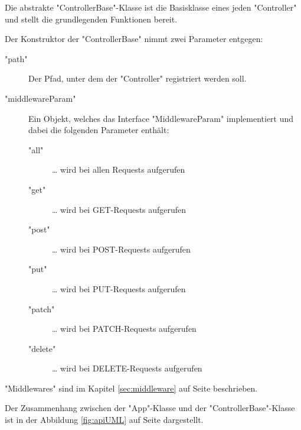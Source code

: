 
Die abstrakte "{\ttfamily ControllerBase}"-Klasse ist die Basisklasse eines jeden "Controller" und stellt die grundlegenden Funktionen bereit. 

Der Konstruktor der "ControllerBase" nimmt zwei Parameter entgegen:

\begin{description}
    \item["path"] Der Pfad, unter dem der "Controller" registriert werden soll.
    \item["middlewareParam"] Ein Objekt, welches das Interface "MiddlewareParam" implementiert und dabei die folgenden Parameter enthält:
    \begin{description}
        \item["all"] … wird bei allen Requests aufgerufen
        \item["get"] … wird bei GET-Requests aufgerufen
        \item["post"] … wird bei POST-Requests aufgerufen
        \item["put"] … wird bei PUT-Requests aufgerufen
        \item["patch"] … wird bei PATCH-Requests aufgerufen
        \item["delete"] … wird bei DELETE-Requests aufgerufen
    \end{description}
\end{description}


"Middlewares" sind im Kapitel \ref{sec:middleware} auf Seite \pageref{sec:middleware} beschrieben.

Der Zusammenhang zwischen der "App"-Klasse und der "ControllerBase"-Klasse ist in der Abbildung \ref{fig:apiUML} auf Seite \pageref{fig:apiUML} dargestellt.

